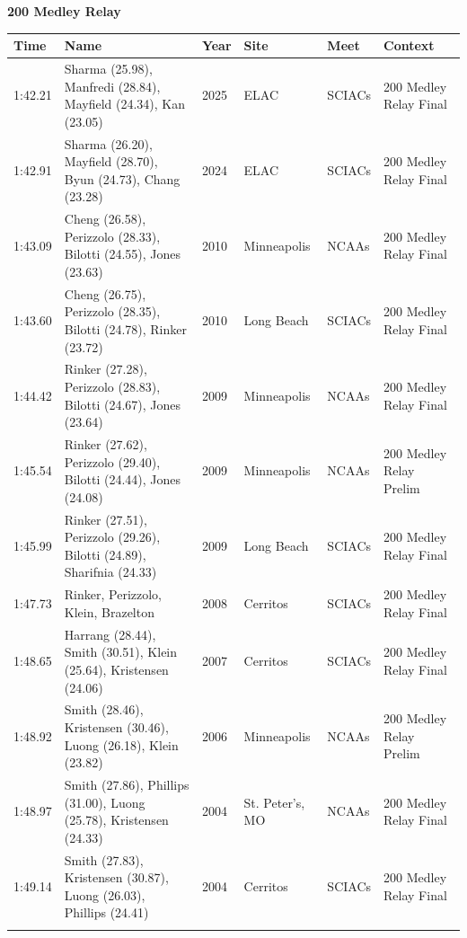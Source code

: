 \vspace{1.2em}
\noindent\begin{minipage}[t]{0.98\textwidth}
\centering
\textbf{\textcolor{teamprimary}{200 Medley Relay}}\par
\vspace{0.5em}
\centering
\small
\renewcommand{\arraystretch}{1.0}
\setlength{\tabcolsep}{4pt}
\begin{tabular}{@{}p{2.0cm}p{3.2cm}p{1.2cm}p{2.0cm}p{2.0cm}p{2.5cm}@{}}
\toprule
\textbf{Time} & \textbf{Name} & \textbf{Year} & \textbf{Site} & \textbf{Meet} & \textbf{Context} \\
\midrule
1:42.21 & Sharma (25.98), Manfredi (28.84), Mayfield (24.34), Kan (23.05) & 2025 & ELAC & SCIACs & 200 Medley Relay Final \\
1:42.91 & Sharma (26.20), Mayfield (28.70), Byun (24.73), Chang (23.28) & 2024 & ELAC & SCIACs & 200 Medley Relay Final \\
1:43.09 & Cheng (26.58), Perizzolo (28.33), Bilotti (24.55), Jones (23.63) & 2010 & Minneapolis & NCAAs & 200 Medley Relay Final \\
1:43.60 & Cheng (26.75), Perizzolo (28.35), Bilotti (24.78), Rinker (23.72) & 2010 & Long Beach & SCIACs & 200 Medley Relay Final \\
1:44.42 & Rinker (27.28), Perizzolo (28.83), Bilotti (24.67), Jones (23.64) & 2009 & Minneapolis & NCAAs & 200 Medley Relay Final \\
1:45.54 & Rinker (27.62), Perizzolo (29.40), Bilotti (24.44), Jones (24.08) & 2009 & Minneapolis & NCAAs & 200 Medley Relay Prelim \\
1:45.99 & Rinker (27.51), Perizzolo (29.26), Bilotti (24.89), Sharifnia (24.33) & 2009 & Long Beach & SCIACs & 200 Medley Relay Final \\
1:47.73 & Rinker, Perizzolo, Klein, Brazelton & 2008 & Cerritos & SCIACs & 200 Medley Relay Final \\
1:48.65 & Harrang (28.44), Smith (30.51), Klein (25.64), Kristensen (24.06) & 2007 & Cerritos & SCIACs & 200 Medley Relay Final \\
1:48.92 & Smith (28.46), Kristensen (30.46), Luong (26.18), Klein (23.82) & 2006 & Minneapolis & NCAAs & 200 Medley Relay Prelim \\
1:48.97 & Smith (27.86), Phillips (31.00), Luong (25.78), Kristensen (24.33) & 2004 & St. Peter's, MO & NCAAs & 200 Medley Relay Final \\
1:49.14 & Smith (27.83), Kristensen (30.87), Luong (26.03), Phillips (24.41) & 2004 & Cerritos & SCIACs & 200 Medley Relay Final \\
\bottomrule
\vspace{0.5em}
\end{tabular}
\end{minipage}
